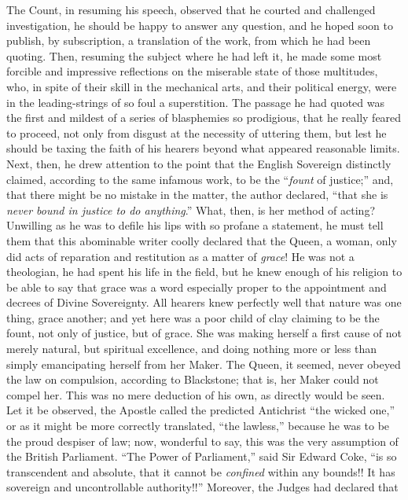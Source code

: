 The Count, in resuming his speech, observed that he
courted and challenged investigation, he should be happy
to answer any question, and he hoped soon to publish, by
subscription, a translation of the work, from which he
had been quoting. Then, resuming the subject where he had
left it, he made some most forcible and impressive
reflections on the miserable state of those multitudes,
who, in spite of their skill in the mechanical arts, and
their political energy, were in the leading-strings of so
foul a superstition. The passage he had quoted was the
first and mildest of a series of blasphemies so
prodigious, that he really feared to proceed, not only
from disgust at the necessity of uttering them, but lest
he should be taxing the faith of his hearers beyond what
appeared reasonable limits. Next, then, he drew attention
to the point that the English Sovereign distinctly
claimed, according to the same infamous work, to be the
``\emph{fount} of justice;'' and, that there
might be no mistake in the matter, the author declared,
``that she is \emph{never bound in justice to do
anything}.'' What, then, is her method of acting?
Unwilling as he was to defile his lips with so profane a
statement, he must tell them that this abominable writer
coolly declared that the Queen, a woman, only did acts of
reparation and restitution as a matter of \emph{grace}!
He was not a theologian, he had spent his life in the
field, but he knew enough of his religion to be able to
say that grace was a word especially proper to the
appointment and decrees of Divine Sovereignty. All
hearers knew perfectly well that nature was one thing,
grace another; and yet here was a poor child of clay
claiming to be the fount, not only of justice, but of
grace. She was making herself a first cause of not merely
natural, but spiritual excellence, and doing nothing more
or less than simply emancipating herself from her Maker.
The Queen, it seemed, never obeyed the law on compulsion,
according to Blackstone; that is, her Maker could not
compel her. This was no mere deduction of his own, as
directly would be seen. Let it be observed, the Apostle called the predicted Antichrist ``the wicked
one,'' or as it might be more correctly translated,
``the lawless,'' because he was to be the proud
despiser of law; now, wonderful to say, this was the very
assumption of the British Parliament. ``The Power of
Parliament,'' said Sir Edward Coke, ``is so
transcendent and absolute, that it cannot be \emph{confined}
within any bounds!! It has sovereign and uncontrollable
authority!!'' Moreover, the Judges had declared that

